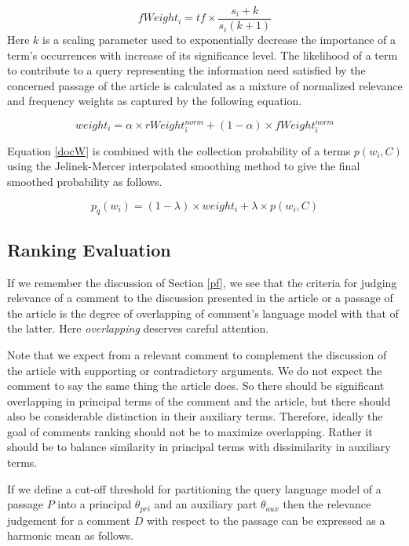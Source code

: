 \documentclass[article]{IEEEtran}
\begin{document}
\begin{equation}
fWeight_i = tf \times {\frac{s_i + k}{s_i (k + 1)}}
\end{equation}   
Here $k$ is a scaling parameter used to exponentially decrease the importance of a term's occurrences with increase of its significance level.
The likelihood of a term to contribute to a query representing the information need satisfied by the concerned passage of the article is calculated as a mixture of normalized relevance and frequency weights as captured by the following equation.

\begin{equation}
\label{docW}
weight_i = \alpha \times rWeight_i^{norm} + (1 - \alpha) \times fWeight_i^{norm}
\end{equation}

Equation \ref{docW} is combined with the collection probability of a terms $p(w_i, C)$ using the Jelinek-Mercer interpolated smoothing method \cite{1371580} to give the final smoothed probability as follows.   

\begin{equation}
\label{wProb}
p_q(w_i) = (1 - \lambda) \times weight_i + \lambda \times p(w_i, C) 
\end{equation}

\subsection{Ranking Evaluation}
If we remember the discussion of Section \ref{pf}, we see that the criteria for judging relevance of a comment to the discussion presented in the article or a passage of the article is the degree of overlapping of comment's language model with that of the latter. Here \textit{overlapping} deserves careful attention.

Note that we expect from a relevant comment to complement the discussion of the article with supporting or contradictory arguments. We do not expect the comment to say the same thing the article does. So there should be significant overlapping in principal terms of the comment and the article, but there should also be considerable distinction in their auxiliary terms. Therefore, ideally the goal of comments ranking should not be to maximize overlapping. Rather it should be to balance similarity in principal terms with dissimilarity in auxiliary terms.

If we define a cut-off threshold for partitioning the query language model of a passage $P$ into a principal $\theta_{pri}$ and an auxiliary part $\theta_{aux}$ then the relevance judgement for a comment $D$ with respect to the passage can be expressed as a harmonic mean as follows.
\end{document}
